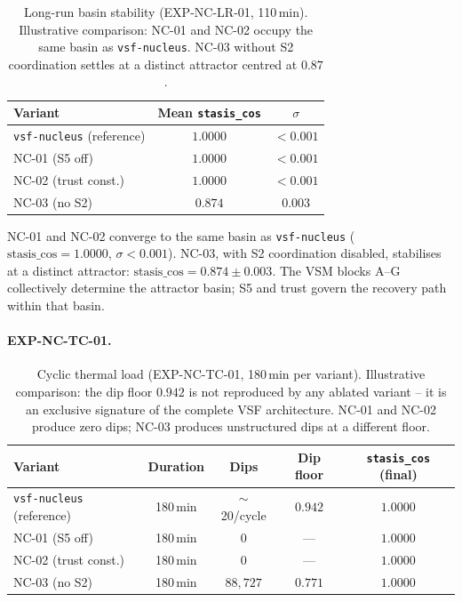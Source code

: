 \documentclass[11pt, a4paper]{article}
\newcommand{\nucleus}{\texttt{vsf-nucleus}}
\begin{document}
\begin{table}[h]
\centering
\begin{tabular}{lcc}
\hline
Variant & Mean \texttt{stasis\_cos} & $\sigma$ \\
\hline
\nucleus{} (reference) & $1.0000$ & $<0.001$ \\
NC-01 (S5 off)          & $1.0000$ & $<0.001$ \\
NC-02 (trust const.)    & $1.0000$ & $<0.001$ \\
NC-03 (no S2)           & $0.874$  & $0.003$ \\
\hline
\end{tabular}
\caption{Long-run basin stability (EXP-NC-LR-01, 110\,min). Illustrative comparison: NC-01 and NC-02
occupy the same basin as \nucleus{}. NC-03 without S2 coordination settles
at a distinct attractor centred at $0.87$.}
\label{tab:nc_longrun}
\end{table}

NC-01 and NC-02 converge to the same basin as \nucleus{} ($\text{stasis\_cos}
= 1.0000$, $\sigma < 0.001$).
NC-03, with S2 coordination disabled, stabilises at a distinct attractor:
$\text{stasis\_cos} = 0.874 \pm 0.003$.
The VSM blocks A--G collectively determine the attractor basin;
S5 and trust govern the recovery path within that basin.

\paragraph{EXP-NC-TC-01.}

\begin{table}[h]
\centering
\begin{tabular}{lcccc}
\hline
Variant & Duration & Dips & Dip floor & \texttt{stasis\_cos} (final) \\
\hline
\nucleus{} (reference) & 180\,min & $\sim$20/cycle & $0.942$ & $1.0000$ \\
NC-01 (S5 off)          & 180\,min & $0$            & ---     & $1.0000$ \\
NC-02 (trust const.)    & 180\,min & $0$            & ---     & $1.0000$ \\
NC-03 (no S2)           & 180\,min & $88{,}727$     & $0.771$ & $1.0000$ \\
\hline
\end{tabular}
\caption{Cyclic thermal load (EXP-NC-TC-01, 180\,min per variant). Illustrative comparison: the dip floor
$0.942$ is not reproduced by any ablated variant -- it is an exclusive signature
of the complete VSF architecture. NC-01 and NC-02 produce zero dips; NC-03
produces unstructured dips at a different floor.}
\label{tab:nc_tc}
\end{table}
\end{document}
